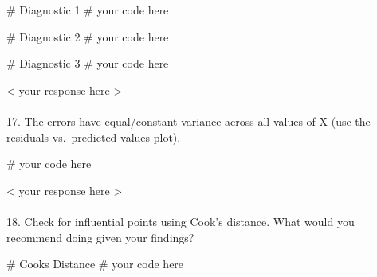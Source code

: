 \documentclass[
  letterpaper,
  DIV=11,
  numbers=noendperiod]{scrartcl}
\makeatletter
\let\oldparagraph\paragraph
\renewcommand{\paragraph}{
    \@ifstar
      \xxxParagraphStar
      \xxxParagraphNoStar
  }
\newcommand{\xxxParagraphStar}[1]{\oldparagraph*{#1}\mbox{}}
\newcommand{\xxxParagraphNoStar}[1]{\oldparagraph{#1}\mbox{}}
\newenvironment{Shaded}{\begin{snugshade}}{\end{snugshade}}
\newcommand{\CommentTok}[1]{\textcolor[rgb]{0.37,0.37,0.37}{#1}}
\makeatother
\begin{document}
\begin{Shaded}
\begin{Highlighting}[]
\CommentTok{\# Diagnostic 1}
\CommentTok{\# your code here}
\end{Highlighting}
\end{Shaded}

\begin{Shaded}
\begin{Highlighting}[]
\CommentTok{\# Diagnostic 2}
\CommentTok{\# your code here}
\end{Highlighting}
\end{Shaded}

\begin{Shaded}
\begin{Highlighting}[]
\CommentTok{\# Diagnostic 3}
\CommentTok{\# your code here}
\end{Highlighting}
\end{Shaded}

\textless{} your response here \textgreater{}

\paragraph{17. The errors have equal/constant variance across all values
of X (use the residuals vs.~predicted values
plot).}\label{the-errors-have-equalconstant-variance-across-all-values-of-x-use-the-residuals-vs.-predicted-values-plot.}

\begin{Shaded}
\begin{Highlighting}[]
\CommentTok{\# your code here}
\end{Highlighting}
\end{Shaded}

\textless{} your response here \textgreater{}

\paragraph{18. Check for influential points using Cook's distance. What
would you recommend doing given your
findings?}\label{check-for-influential-points-using-cooks-distance.-what-would-you-recommend-doing-given-your-findings}

\begin{Shaded}
\begin{Highlighting}[]
\CommentTok{\# Cook\textquotesingle{}s Distance}
\CommentTok{\# your code here}
\end{Highlighting}
\end{Shaded}
\end{document}
